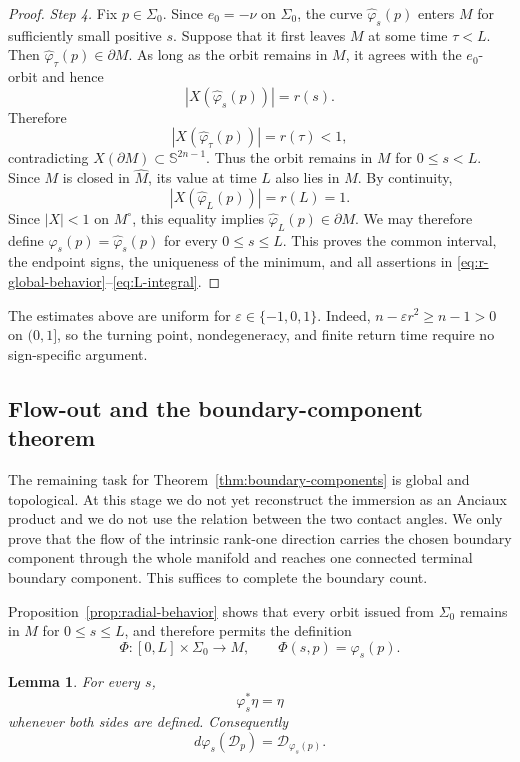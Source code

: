 \documentclass[11pt,a4paper]{article}
\numberwithin{equation}{section}
\newtheorem{lemma}[theorem]{Lemma}
\newcommand{\Sph}{\mathbb S}
\newcommand{\Dcal}{\mathcal D}
\begin{document}
\begin{proof}
\smallskip
\noindent\emph{Step 4.}
Fix $p\in\Sigma_0$.  Since $e_0=-\nu$ on $\Sigma_0$, the curve
$\widehat\varphi_s(p)$ enters $M$ for sufficiently small positive $s$.
Suppose that it first leaves $M$ at some time $\tau<L$.  Then
$\widehat\varphi_\tau(p)\in\partial M$.  As long as the orbit remains in
$M$, it agrees with the $e_0$-orbit and hence
$$
        |X(\widehat\varphi_s(p))|=r(s).
$$
Therefore
$$
        |X(\widehat\varphi_\tau(p))|=r(\tau)<1,
$$
contradicting $X(\partial M)\subset\Sph^{2n-1}$.  Thus the orbit remains in
$M$ for $0\le s<L$.  Since $M$ is closed in $\widehat M$, its value at time
$L$ also lies in $M$.  By continuity,
$$
        |X(\widehat\varphi_L(p))|=r(L)=1.
$$
Since $|X|<1$ on $M^\circ$, this equality implies
$\widehat\varphi_L(p)\in\partial M$.  We may therefore define
$\varphi_s(p)=\widehat\varphi_s(p)$ for every $0\le s\le L$.
This proves the common interval, the endpoint signs, the uniqueness of the
minimum, and all assertions in \eqref{eq:r-global-behavior}--\eqref{eq:L-integral}.
\end{proof}

The estimates above are uniform for $\varepsilon\in\{-1,0,1\}$.  Indeed,
$n-\varepsilon r^2\ge n-1>0$ on $(0,1]$, so the turning point,
nondegeneracy, and finite return time require no sign-specific argument.

\subsection{Flow-out and the boundary-component theorem}

The remaining task for Theorem~\ref{thm:boundary-components} is global and topological.  At this stage we do not yet reconstruct the immersion as an Anciaux product and we do not use the relation between the two contact angles.  We only prove that the flow of the intrinsic rank-one direction carries the chosen boundary component through the whole manifold and reaches one connected terminal boundary component.  This suffices to complete the boundary count.


Proposition~\ref{prop:radial-behavior} shows that every orbit issued from
$\Sigma_0$ remains in $M$ for
$0\le s\le L$, and therefore permits the definition
\begin{equation}\label{eq:global-flow-map}
        \Phi:[0,L]\times\Sigma_0\longrightarrow M,
        \qquad
        \Phi(s,p)=\varphi_s(p).
\end{equation}

\begin{lemma}\label{lem:flow-preserves-D}
For every $s$,
\begin{equation}\label{eq:flow-preserve-eta}
        \varphi_s^*\eta=\eta
\end{equation}
whenever both sides are defined.  Consequently
$$
        d\varphi_s(\Dcal_p)=\Dcal_{\varphi_s(p)}.
$$
\end{lemma}
\end{document}
